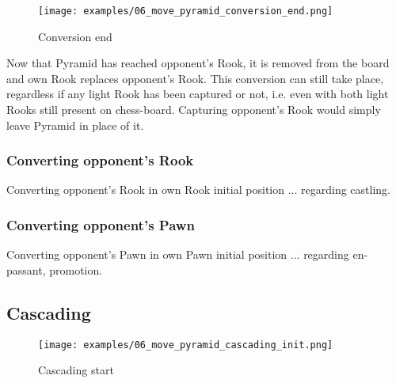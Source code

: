 \clearpage %

\noindent
\begin{figure}[!h]
\texttt{[image: examples/06\_move\_pyramid\_conversion\_end.png]}
\caption{Conversion end}
\label{fig:06_move_pyramid_conversion_end}
\end{figure}

Now that Pyramid has reached opponent's Rook, it is removed from the board and
own Rook replaces opponent's Rook. This conversion can still take place, regardless
if any light Rook has been captured or not, i.e. even with both light Rooks still
present on chess-board. Capturing opponent's Rook would simply leave Pyramid in
place of it.

\clearpage %

\subsubsection*{Converting opponent's Rook}

Converting opponent's Rook in own Rook initial position ... regarding castling.

\subsubsection*{Converting opponent's Pawn}

Converting opponent's Pawn in own Pawn initial position ... regarding en-passant, promotion.

\clearpage %

\subsection*{Cascading}

\noindent
\begin{figure}[!h]
\texttt{[image: examples/06\_move\_pyramid\_cascading\_init.png]}
\caption{Cascading start}
\label{fig:06_move_pyramid_cascading_init}
\end{figure}

